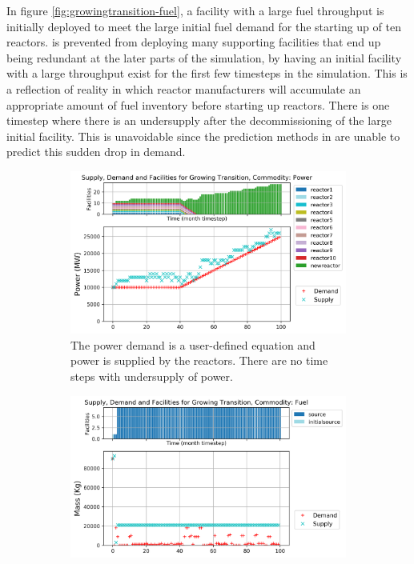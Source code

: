 In figure \ref{fig:growingtransition-fuel},
a facility with a large fuel throughput is initially
deployed to meet the large initial fuel demand for the starting
up of ten reactors. 
\deploy is prevented from deploying many supporting
facilities that end up being redundant at the later parts of 
the simulation, by having an initial facility with a large throughput
exist for the first few timesteps in the simulation.
This is a reflection of reality in which reactor manufacturers will 
accumulate an appropriate amount of fuel inventory before starting 
up reactors. 
There is one timestep where there is an undersupply after the 
decommissioning of the large initial facility.  
This is unavoidable since the prediction methods in \deploy are 
unable to predict this sudden drop in demand. 

\begin{figure}[]
    \centering
    \begin{subfigure}[t]{\textwidth}
    \centering
        \includegraphics[width=0.8\linewidth]{figures/growingtransition-power.png} 
        \caption{The power demand is a user-defined equation and power is supplied by the reactors.
        There are no time steps with undersupply of power.}
        \label{fig:growingtransition-power}
    \end{subfigure}
    \begin{subfigure}[t]{0.65\textwidth}
        \centering
        \includegraphics[width=\linewidth]{figures/growingtransition-fuel.png} 

\end{subfigure}
\end{figure}

